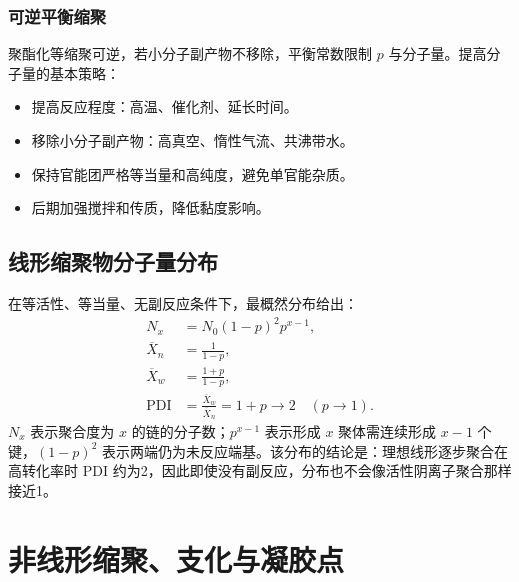 \documentclass[UTF8,a4paper,10pt,twocolumn]{ctexart}
\newcommand{\Xn}{\overline{X}_n}
\newcommand{\Xw}{\overline{X}_w}
\newcommand{\PDI}{\mathrm{PDI}}
\begin{document}
\subsubsection{可逆平衡缩聚}
聚酯化等缩聚可逆，若小分子副产物不移除，平衡常数限制 $p$ 与分子量。提高分子量的基本策略：
\begin{itemize}
  \item 提高反应程度：高温、催化剂、延长时间。
  \item 移除小分子副产物：高真空、惰性气流、共沸带水。
  \item 保持官能团严格等当量和高纯度，避免单官能杂质。
  \item 后期加强搅拌和传质，降低黏度影响。
\end{itemize}

\subsection{线形缩聚物分子量分布}
在等活性、等当量、无副反应条件下，最概然分布给出：
\begin{align*}
  N_x  & =N_0(1-p)^2p^{x-1},                   \\
  \Xn  & =\frac{1}{1-p},                       \\
  \Xw  & =\frac{1+p}{1-p},                     \\
  \PDI & =\frac{\Xw}{\Xn}=1+p\to2\quad(p\to1).
\end{align*}
$N_x$ 表示聚合度为 $x$ 的链的分子数；$p^{x-1}$ 表示形成 $x$ 聚体需连续形成 $x-1$ 个键，$(1-p)^2$ 表示两端仍为未反应端基。该分布的结论是：理想线形逐步聚合在高转化率时 $\PDI$ 约为2，因此即使没有副反应，分布也不会像活性阴离子聚合那样接近1。

\section{非线形缩聚、支化与凝胶点}
\end{document}
